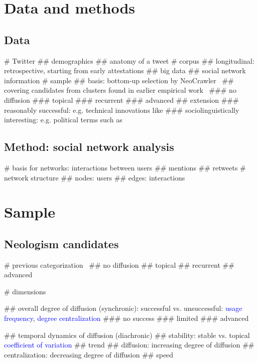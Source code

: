 \documentclass[
  a4paper,
  ]{scrartcl}
\newcommand{\mtrc}[1]{\textcolor{blue}{#1}}
\begin{document}
\section{Data and methods}

  \subsection{Data}

    \begin{easylist}[itemize]
      # Twitter
        ## demographics
        ## anatomy of a tweet
      # corpus
        ## longitudinal: retrospective, starting from early attestations
        ## big data
        ## social network information
      # sample
        ## basis: bottom-up selection by NeoCrawler~\parencite{Kerremans2018}
        ## covering candidates from clusters found in earlier empirical work~\parencite{Kerremans2015}
          ### no diffusion
          ### topical
          ### recurrent
          ### advanced
        ## extension
          ### reasonably successful: e.g. technical innovations like 
          ### sociolinguistically interesting: e.g. political terms such as 
    \end{easylist}

  \subsection{Method: social network analysis}

    \begin{easylist}[itemize]
      # basis for networks: interactions between users
        ## mentions
        ## retweets
      # network structure
        ## nodes: users
        ## edges: interactions
    \end{easylist}

\section{Sample}

  \subsection{Neologism candidates}

    \begin{easylist}[itemize]

      # previous categorization~\parencite{Kerremans2015}
        ## no diffusion
        ## topical
        ## recurrent
        ## advanced

      # dimensions

        ## overall degree of diffusion (synchronic): successful vs. unsuccessful: \mtrc{usage frequency}, \mtrc{degree centralization}
          ### no success
          ### limited
          ### advanced

        ## temporal dynamics of diffusion (diachronic)
          ## stability: stable vs. topical \mtrc{coefficient of variation}
          ## trend
            ## diffusion: increasing degree of diffusion
            ## centralization: decreasing degree of diffusion
          ## speed

    \end{easylist}
\end{document}
